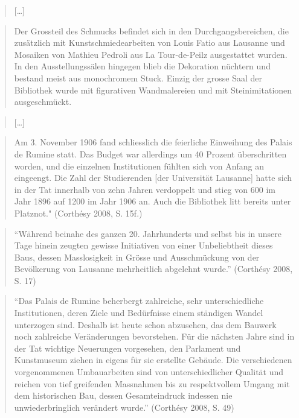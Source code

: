 \documentclass[a4paper,
fontsize=11pt,
oneside,
numbers=noperiodatend,
parskip=half-,
bibliography=totoc,
final
]{scrartcl}
\begin{document}
\begin{quote}
{[}\ldots{}{]}
\end{quote}

\begin{quote}
Der Grossteil des Schmucks befindet sich in den Durchgangsbereichen, die
zusätzlich mit Kunstschmiedearbeiten von Louis Fatio aus Lausanne und
Mosaiken von Mathieu Pedroli aus La Tour-de-Peilz ausgestattet wurden.
In den Ausstellungssälen hingegen blieb die Dekoration nüchtern und
bestand meist aus monochromem Stuck. Einzig der grosse Saal der
Bibliothek wurde mit figurativen Wandmalereien und mit Steinimitationen
ausgeschmückt.
\end{quote}

\begin{quote}
{[}\ldots{}{]}
\end{quote}

\begin{quote}
Am 3. November 1906 fand schliesslich die feierliche Einweihung des
Palais de Rumine statt. Das Budget war allerdings um 40 Prozent
überschritten worden, und die einzelnen Institutionen fühlten sich von
Anfang an eingeengt. Die Zahl der Studierenden {[}der Universität
Lausanne{]} hatte sich in der Tat innerhalb von zehn Jahren verdoppelt
und stieg von 600 im Jahr 1896 auf 1200 im Jahr 1906 an. Auch die
Bibliothek litt bereits unter Platznot." (Corthésy 2008, S. 15f.)
\end{quote}

\begin{quote}
\enquote{Während beinahe des ganzen 20. Jahrhunderts und selbst bis in
unsere Tage hinein zeugten gewisse Initiativen von einer Unbeliebtheit
dieses Baus, dessen Masslosigkeit in Grösse und Ausschmückung von der
Bevölkerung von Lausanne mehrheitlich abgelehnt wurde.} (Corthésy 2008,
S. 17)
\end{quote}

\begin{quote}
\enquote{Das Palais de Rumine beherbergt zahlreiche, sehr
unterschiedliche Institutionen, deren Ziele und Bedürfnisse einem
ständigen Wandel unterzogen sind. Deshalb ist heute schon abzusehen, das
dem Bauwerk noch zahlreiche Veränderungen bevorstehen. Für die nächsten
Jahre sind in der Tat wichtige Neuerungen vorgesehen, den Parlament und
Kunstmuseum ziehen in eigens für sie erstellte Gebäude. Die
verschiedenen vorgenommenen Umbauarbeiten sind von unterschiedlicher
Qualität und reichen von tief greifenden Massnahmen bis zu respektvollem
Umgang mit dem historischen Bau, dessen Gesamteindruck indessen nie
unwiederbringlich verändert wurde.} (Corthésy 2008, S. 49)
\end{quote}
\end{document}
